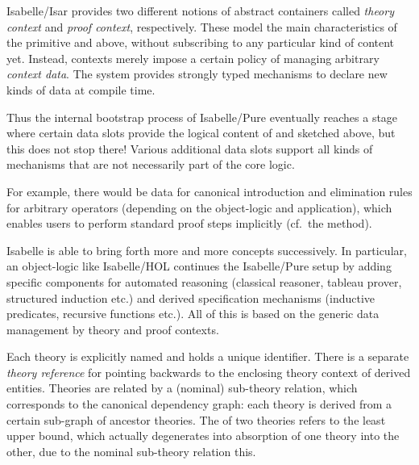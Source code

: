 \begin{isabellebody}
\begin{isamarkuptext}
\begin{itemize}
  \end{itemize}

  \medskip Isabelle/Isar provides two different notions of abstract
  containers called \emph{theory context} and \emph{proof context},
  respectively.  These model the main characteristics of the primitive
  \isa{{\isasymTheta}} and \isa{{\isasymGamma}} above, without subscribing to any
  particular kind of content yet.  Instead, contexts merely impose a
  certain policy of managing arbitrary \emph{context data}.  The
  system provides strongly typed mechanisms to declare new kinds of
  data at compile time.

  Thus the internal bootstrap process of Isabelle/Pure eventually
  reaches a stage where certain data slots provide the logical content
  of \isa{{\isasymTheta}} and \isa{{\isasymGamma}} sketched above, but this does not
  stop there!  Various additional data slots support all kinds of
  mechanisms that are not necessarily part of the core logic.

  For example, there would be data for canonical introduction and
  elimination rules for arbitrary operators (depending on the
  object-logic and application), which enables users to perform
  standard proof steps implicitly (cf.\ the  method).

  Isabelle is able to bring forth more and more concepts successively.
  In particular, an object-logic like Isabelle/HOL continues the
  Isabelle/Pure setup by adding specific components for automated
  reasoning (classical reasoner, tableau prover, structured induction
  etc.) and derived specification mechanisms (inductive predicates,
  recursive functions etc.).  All of this is based on the generic data
  management by theory and proof contexts.%
\end{isamarkuptext}%
\isamarkuptrue%
%
\isamarkuptrue%
%
\begin{isamarkuptext}%

  Each theory is explicitly named and holds a unique identifier.
  There is a separate \emph{theory reference} for pointing backwards
  to the enclosing theory context of derived entities.  Theories are
  related by a (nominal) sub-theory relation, which corresponds to the
  canonical dependency graph: each theory is derived from a certain
  sub-graph of ancestor theories.  The  of two theories
  refers to the least upper bound, which actually degenerates into
  absorption of one theory into the other, due to the nominal
  sub-theory relation this.


\end{isamarkuptext}
\end{isabellebody}
